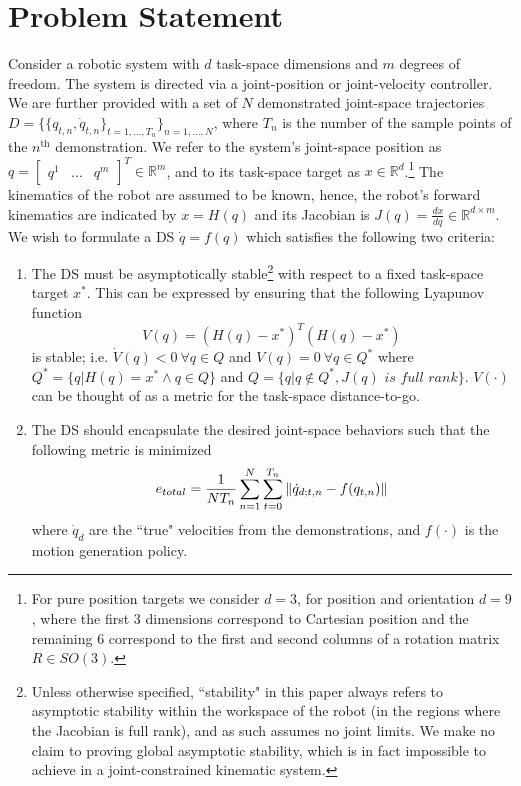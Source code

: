 \documentclass[letterpaper, 10 pt, journal, twoside, fleqn]{IEEEtran}
\begin{document}
\section{Problem Statement} \label{Sec:Prob}
Consider a robotic system with $d$ task-space dimensions and $m$ degrees of freedom. The system is directed via a joint-position or joint-velocity controller. We are further provided with a set of $N$ demonstrated joint-space trajectories $D=\{\{q_{t,n},\dot{q}_{t,n}\}_{t=1,\dots, T_n}\}_{n=1,\dots,N}$, where $T_n$ is the number of the sample points of the $n^{\text{th}}$ demonstration. We refer to the system's joint-space position as $q=\begin{bmatrix} q^1 & \dots & q^m
\end{bmatrix}^T \in \mathbb{R}^m$, and to its task-space target as $x\in \mathbb{R}^d$.\footnote{For pure position targets we consider $d=3$, for position and orientation $d=9$, where the first 3 dimensions correspond to Cartesian position and the remaining 6 correspond to the first and second columns of a rotation matrix $R \in SO(3)$.} The kinematics of the robot are assumed to be known, hence, the robot's forward kinematics are indicated by $x = H(q)$ and its Jacobian is $J(q) = \frac{dx}{dq}\in \mathbb{R}^{d\times m}$.
We wish to formulate a DS $\dot{q} = f(q)$ which satisfies the following two criteria:
\renewcommand{\labelenumi}{(\Roman{enumi})}
\begin{enumerate}
\item The DS must be asymptotically stable\footnote{Unless otherwise specified, ``stability" in this paper always refers to asymptotic stability within the workspace of the robot (in the regions where the Jacobian is full rank), and as such assumes no joint limits. We make no claim to proving global asymptotic stability, which is in fact impossible to achieve in a joint-constrained kinematic system.} with respect to a fixed task-space target $x^*$. This can be expressed by ensuring that the following Lyapunov function\begin{equation}
V(q) = (H(q) - x^*)^T(H(q) - x^*) 
\label{eq:Lyp}
\end{equation}
is stable; i.e. $\dot{V}(q) < 0 ~\forall q\in Q$ and $V(q)=0~ \forall q\in Q^*$ where $Q^*=\{q|H(q)=x^*\wedge q\in Q\}$ and $Q=\{q|q\notin Q^*, J(q) \textit{ is full rank}\}$. $V(\cdot)$ can be thought of as a metric for the task-space distance-to-go.
\item The DS should encapsulate the desired joint-space behaviors such that the following metric is minimized
\begin{equation}
\vspace{-5pt}
e_{total} = \frac{1}{NT_n}\sum_{n=1}^N\sum_{t=0}^{T_n} \left \| \dot{q}_{d; t,n} - f(q_{t,n}) \right \|
\label{eq:optim_error}
\end{equation}
  where $\dot{q}_d$ are the ``true" velocities from the demonstrations, and $f(\cdot)$ is the motion generation policy.
\end{enumerate}
\end{document}
